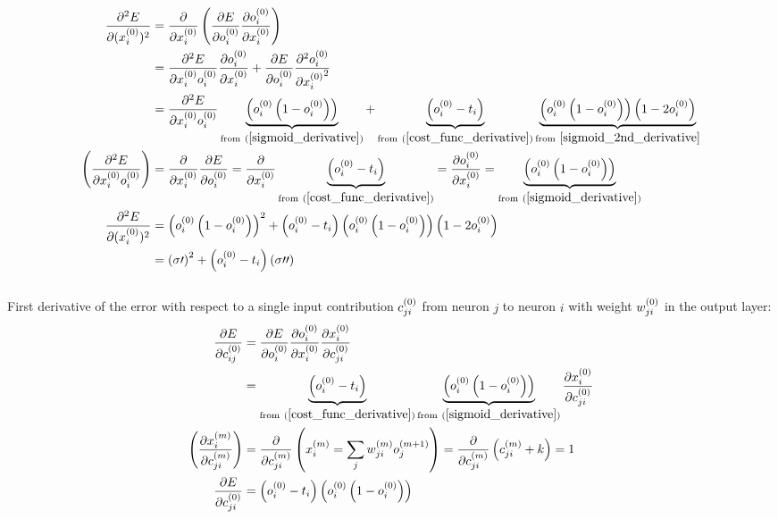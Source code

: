 \begin{align}
\pdv[2]{E}{(\Input i 0)} &= \pdv{}{\Input i 0}
\left(\pdv{E}{\Out i 0}\pdv{\Out i 0}{\Input i 0}\right) 
\\
&= \pdv{{^2}E}{{\Input i 0}{\Out i 0}}\pdv{\Out i 0}{\Input i 0} + \pdv{E}{\Out i 0}\pdv[2]{\Out i 0}{{\Input i 0}}
\\
&= \pdv{{^2}E}{{\Input i 0}{\Out i 0}}\underbrace{\left(\Out i 0 \left(1 - \Out i 0\right)\right)}_{{\text{from} \ (\ref{sigmoid_derivative})}} + \underbrace{\left(\Out i 0 - \Target i\right)}_{\text{from} \ (\ref{cost_func_derivative})}\underbrace{\left(\Out i 0 \left(1 - \Out i 0\right)\right)\left(1 - 2\Out i 0\right) }_{\text{from}\ \ref{sigmoid_2nd_derivative}}
\\
\left(\pdv{{^2}E}{{\Input i 0}{\Out i 0}}\right) &= \pdv{}{\Input i 0}\pdv{E}{\Out i 0} = \pdv{}{\Input i 0}\underbrace{\left(\Out i 0 - \Target i\right)}_{\text{from} \ (\ref{cost_func_derivative})} = \pdv{\Out i 0}{\Input i 0} = \underbrace{\left(\Out i 0 \left(1 - \Out i 0\right)\right)}_{{\text{from} \ (\ref{sigmoid_derivative})}} 
\\
\pdv[2]{E}{(\Input i 0)}&= \left(\Out i 0 \left(1 - \Out i 0\right)\right)^2 + \left(\Out i 0 - \Target i\right)\left(\Out i 0 \left(1 - \Out i 0\right)\right)\left(1 - 2\Out i 0\right) 
\\
&= \left(\sigma\prime\right)^2 + \left(\Out i 0 - \Target i\right)\left(\sigma\prime\prime\right)
\end{align}
\\[5pt]First derivative of the error with respect to a single input contribution $c_{ji}^{(0)}$ from neuron $j$ to neuron $i$ with weight $w_{ji}^{(0)}$ in the output layer:
\begin{align}
\pdv{E}{\Con i j 0} &= \pdv{E}{\Out i 0}\pdv{\Out i 0}{\Input i 0}\pdv{\Input i 0}{\Con j i 0}
\\
&= \underbrace{\left(\Out i 0 - \Target i \right)}_{\text{from} \ (\ref{cost_func_derivative})} \underbrace{\left(\Out i 0 \left(1 - \Out i 0\right) \right)}_{\text{from} \ (\ref{sigmoid_derivative})} \pdv{\Input i 0}{\Con j i 0} 
\\
\left( \pdv{\Input i m}{\Con j i m}\right) &= \pdv{}{\Con j i m}\left(\Input i m = \sum_j\Weight j i m\Out j {m+1} \right) = \pdv{}{\Con j i m} \left(\Con j i m + k \right) = 1\label{dxdc} 
\\
\pdv{E}{\Con j i 0}&= \left(\Out i 0 - \Target i \right) \left(\Out i 0 \left(1 - \Out i 0\right) \right)
\end{align}
